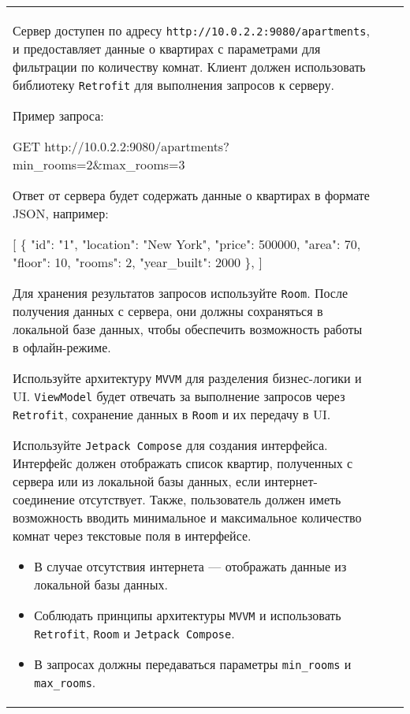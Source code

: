 \documentclass[a4paper]{article}
\begin{document}
\begin{tabular}{!{\vrule width 2pt}p{5cm}|p{6cm}|p{4cm}!{\vrule width 2pt}}
{\begin{minipage}{16cm}
\begin{enumerate}
Сервер доступен по адресу \texttt{http://10.0.2.2:9080/apartments}, и предоставляет данные о квартирах с параметрами для фильтрации по количеству комнат. Клиент должен использовать библиотеку \texttt{Retrofit} для выполнения запросов к серверу.

Пример запроса:

GET http://10.0.2.2:9080/apartments?min\_rooms=2\&max\_rooms=3


Ответ от сервера будет содержать данные о квартирах в формате JSON, например:


[
  \{
    "id": "1",
    "location": "New York",
    "price": 500000,
    "area": 70,
    "floor": 10,
    "rooms": 2,
    "year\_built": 2000
  \},
]


Для хранения результатов запросов используйте \texttt{Room}. 
После получения данных с сервера, они должны сохраняться в локальной базе данных, 
чтобы обеспечить возможность работы в офлайн-режиме. 

Используйте архитектуру \texttt{MVVM} для разделения бизнес-логики и UI. \texttt{ViewModel} будет отвечать за выполнение запросов через \texttt{Retrofit}, сохранение данных в \texttt{Room} и их передачу в UI.

Используйте \texttt{Jetpack Compose} для создания интерфейса. Интерфейс должен отображать список квартир, полученных с сервера или из локальной базы данных, если интернет-соединение отсутствует. Также, пользователь должен иметь возможность вводить минимальное и максимальное количество комнат через текстовые поля в интерфейсе.

\begin{itemize}
  \item В случае отсутствия интернета — отображать данные из локальной базы данных.
  \item Соблюдать принципы архитектуры \texttt{MVVM} и использовать \texttt{Retrofit}, \texttt{Room} и \texttt{Jetpack Compose}.
  \item В запросах должны передаваться параметры \texttt{min\_rooms} и \texttt{max\_rooms}.
\end{itemize} 
\end{enumerate}


\end{minipage}}
\end{tabular}
\end{document}
